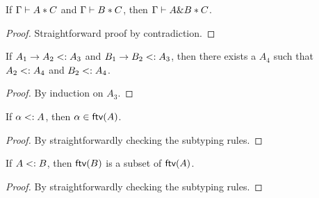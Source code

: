 \begin{theorem}
  \label{theorem:disjoint-intersect}

  If $\Gamma \vdash A * C$ and $\Gamma \vdash B * C$,
  then $\Gamma \vdash A \& B * C$.
\end{theorem}

\begin{proof}
  Straightforward proof by contradiction.
\end{proof}

\begin{lemma}
  \label{lemma:common-supertype}

  If $A_1 \to A_2 <: A_3$ and $B_1 \to B_2 <: A_3$,
  then there exists a $A_4$ such that $A_2 <: A_4$ and $B_2 <: A_4$.
\end{lemma}

\begin{proof}
  By induction on $A_3$.
\end{proof}

\begin{lemma}
  \label{lemma:subtype-ftv-var}

  If $\alpha <: A$, then $\alpha \in \textsf{ftv}(A)$.
\end{lemma}

\begin{proof}
  By straightforwardly checking the subtyping rules.
\end{proof}

\begin{lemma}
  \label{lemma:subtype-ftv}

  If $A <: B$, then $\textsf{ftv}(B)$ is a subset of $\textsf{ftv}(A)$.
\end{lemma}

\begin{proof}
  By straightforwardly checking the subtyping rules.
\end{proof}

\algodissoundness*

